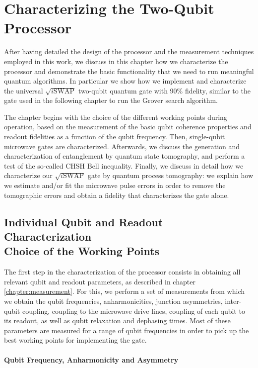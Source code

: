 \chapter{Characterizing the Two-Qubit Processor} \label{chapter:processor_characterization}

After having detailed the design of the processor and the measurement techniques employed in this work, we discuss in this chapter how we characterize the processor and demonstrate the basic functionality that we need to run meaningful quantum algorithms. In particular we show how we implement and characterize the universal $\sqrt{i\mathrm{SWAP}}$ two-qubit quantum gate with 90\% fidelity, similar to the gate used in the following chapter to run the Grover search algorithm.

\smallskip

The chapter begins with the choice of the different working points during operation, based on the measurement of the basic qubit coherence properties and readout fidelities as a function of the qubit frequency.   Then, single-qubit microwave gates are characterized. Afterwards, we discuss the generation and characterization of entanglement by quantum state tomography, and perform a test of the so-called CHSH Bell inequality. Finally, we discuss in detail how we characterize our $\sqrt{i\mathrm{SWAP}}$ gate by quantum process tomography: we explain how we estimate and/or fit the microwave pulse errors in order to remove the tomographic errors and obtain a fidelity that characterizes the gate alone.

\section{Individual Qubit and Readout Characterization \\ Choice of the Working Points}

The first step in the characterization of the processor consists in obtaining all relevant qubit and readout parameters, as described in chapter \ref{chapter:measurement}. For this, we perform a set of measurements from which we obtain the qubit frequencies, anharmonicities, junction asymmetries, inter-qubit coupling, coupling to the microwave drive lines, coupling of each qubit to its readout, as well as qubit relaxation and dephasing times. Most of these parameters are measured for a range of qubit frequencies in order to pick up the best working points for implementing the gate. 

\subsubsection{Qubit Frequency, Anharmonicity and Asymmetry}

